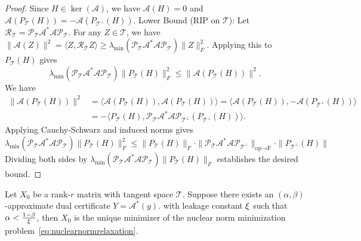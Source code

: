 \begin{proof}
 Since $H \in \ker(\mathcal{A})$, we have $\mathcal{A}(H) = 0$ and $\mathcal{A}(P_{\mathcal{T}}(H)) = -\mathcal{A}(P_{\mathcal{T}^\perp}(H))$.
Lower Bound (RIP on $\mathcal{T}$): Let $\mathcal{R}_{\mathcal{T}} = \mathcal{P}_{\mathcal{T}} \mathcal{A}^* \mathcal{A} \mathcal{P}_{\mathcal{T}}$. For any $Z \in \mathcal{T}$, we have $\|\mathcal{A}(Z)\|^2 = \langle Z, \mathcal{R}_{\mathcal{T}} Z \rangle \ge \lambda_{\min}(\mathcal{P}_{\mathcal{T}} \mathcal{A}^* \mathcal{A} \mathcal{P}_{\mathcal{T}}) \|Z\|_F^2$. Applying this to $P_{\mathcal{T}}(H)$ gives
$$\lambda_{\min}(\mathcal{P}_{\mathcal{T}} \mathcal{A}^* \mathcal{A} \mathcal{P}_{\mathcal{T}}) \|P_{\mathcal{T}}(H)\|_F^2 \le \|\mathcal{A}(P_{\mathcal{T}}(H))\|^2.$$
We have
\begin{align*}
\|\mathcal{A}(P_{\mathcal{T}}(H))\|^2 & = \langle \mathcal{A}(P_{\mathcal{T}}(H)), \mathcal{A}(P_{\mathcal{T}}(H)) \rangle = \langle \mathcal{A}(P_{\mathcal{T}}(H)), -\mathcal{A}(P_{\mathcal{T}^\perp}(H)) \rangle\\
& = -\langle P_{\mathcal{T}}(H), \mathcal{P}_{\mathcal{T}} \mathcal{A}^* \mathcal{A} \mathcal{P}_{\mathcal{T}^\perp} (P_{\mathcal{T}^\perp}(H)) \rangle.
\end{align*}
Applying Cauchy-Schwarz and induced norms gives
$$\lambda_{\min}(\mathcal{P}_{\mathcal{T}} \mathcal{A}^* \mathcal{A} \mathcal{P}_{\mathcal{T}}) \|P_{\mathcal{T}}(H)\|_F^2 \le \|P_{\mathcal{T}}(H)\|_F \cdot \|\mathcal{P}_{\mathcal{T}} \mathcal{A}^* \mathcal{A} \mathcal{P}_{\mathcal{T}^\perp}\|_{\text{op} \to \text{F}} \cdot \|P_{\mathcal{T}^\perp}(H)\|$$
Dividing both sides by $\lambda_{\min}(\mathcal{P}_{\mathcal{T}} \mathcal{A}^* \mathcal{A} \mathcal{P}_{\mathcal{T}}) \|P_{\mathcal{T}}(H)\|_F$ establishes the desired bound. 
\end{proof}










\begin{theorem}\label{th:dualnuclear}
Let $X_0$ be a rank-$r$ matrix with tangent space $\mathcal{T}$. Suppose there exists an $(\alpha, \beta)$-approximate  dual certificate $Y = \mathcal{A}^*(y)$.
 with leakage constant $\xi$ such that $\alpha < \frac{1-\beta}{\xi}$, then $X_0$ is the unique minimizer of the nuclear norm minimization problem~\eqref{eq:nuclearnormrelaxation}.
\end{theorem}

